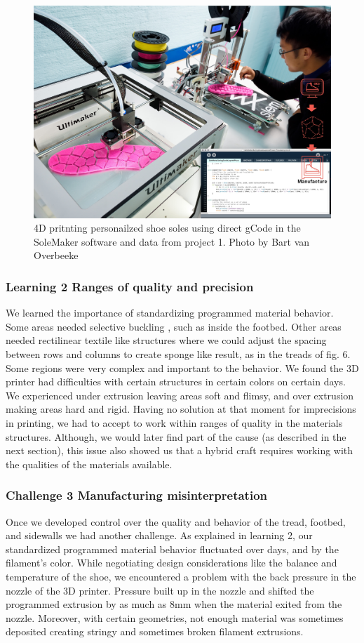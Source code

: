 \begin{figure}
\includegraphics[width=.5\textwidth]{Printing}
\caption{4D pritnting personailzed shoe soles using direct gCode in the SoleMaker software and data from project 1.  Photo by Bart van Overbeeke}
\label{fig:Project2}
\end{figure}

\subsubsection{Learning 2 Ranges of quality and precision}

We learned the importance of standardizing programmed material behavior. Some areas needed selective buckling \cite{Paulose2015}, such as inside the footbed. Other areas needed rectilinear textile like structures where we could adjust the spacing between rows and columns to create sponge like result, as in the treads of fig. 6. Some regions were very complex and important to the behavior. We found the 3D printer had difficulties with certain structures in certain colors on certain days. We experienced under extrusion leaving areas soft and flimsy, and over extrusion making areas hard and rigid. Having no solution at that moment for  imprecisions in printing, we had to accept to work within ranges of quality in the materials structures. Although, we would later find part of the cause (as described in the next section), this issue also showed us that a hybrid craft requires working with the qualities of the materials available. 

\subsubsection{Challenge 3 Manufacturing misinterpretation}

Once we developed control over the quality and behavior of the tread, footbed, and sidewalls we had another challenge. As explained in learning 2, our standardized programmed material behavior fluctuated over days, and by the filament's color. While negotiating design considerations like the balance and temperature of the shoe, we encountered a problem with the back pressure in the nozzle of the 3D printer. Pressure built up in the nozzle and shifted the programmed extrusion by as much as 8mm when the material exited from the nozzle. Moreover, with certain geometries, not enough material was sometimes deposited creating stringy and sometimes broken filament extrusions. 

